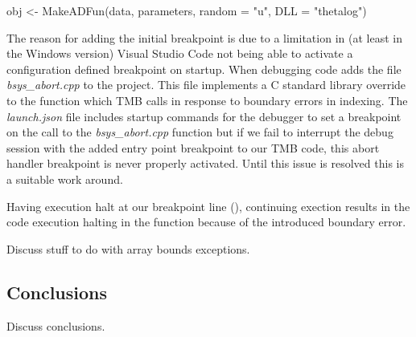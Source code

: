 \begin{Schunk}
  \begin{Sinput}
    obj <- MakeADFun(data, parameters, random = "u", DLL = "thetalog")
  \end{Sinput}
\end{Schunk}

The reason for adding the initial breakpoint is due to a limitation in (at least in the Windows version) Visual Studio Code not 
being able to activate a configuration defined breakpoint on startup. When debugging  code  adds the file \emph{bsys\_abort.cpp}
to the project. This file implements a C standard library override to the  function which TMB calls in response to 
boundary errors in indexing. The \emph{launch.json} file includes startup commands for the debugger to set a breakpoint on the call to 
the \emph{bsys\_abort.cpp} function but if we fail to interrupt the debug session with the added entry point breakpoint to our TMB code, this 
abort handler breakpoint is never properly activated. Until this issue is resolved this is a suitable work around. 

Having execution halt at our breakpoint line (), continuing exection results in the code execution halting in the 
function because of the introduced boundary error. 

Discuss stuff to do with array bounds exceptions.

\hypertarget{Conclusions}{%
\subsection{Conclusions}
\label{Conclusions}}

Discuss conclusions.



\address{%
Paavo Jumppanen\\
CSIRO Marine and Atmospheric Research\\%
Castray Esplanade,\\Battery Point TAS 7004,\\Australia\\
%
\url{https://www.csiro.au}%
\\\href{mailto:paavo.jumppanen@csiro.au}{\nolinkurl{paavo.jumppanen@csiro.au}}
}
